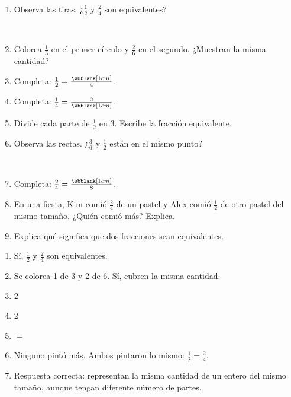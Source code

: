 \begin{wbreview}
\begin{enumerate}
\item Observa las tiras. ¿$\frac{1}{2}$ y $\frac{2}{4}$ son equivalentes? 

\begin{center}
\\[2pt]
\end{center}

\item Colorea $\frac{1}{3}$ en el primer círculo y $\frac{2}{6}$ en el segundo. ¿Muestran la misma cantidad? 

\begin{center}
\hspace{0.8cm}
\end{center}

\item Completa: $\frac{1}{2}=\frac{\wbblank[1cm]}{4}$. 

\item Completa: $\frac{1}{4}=\frac{2}{\wbblank[1cm]}$. 

\item Divide cada parte de $\frac{1}{2}$ en 3. Escribe la fracción equivalente. \wbfracbox {}

\item Observa las rectas. ¿$\frac{3}{6}$ y $\frac{1}{2}$ están en el mismo punto? 

\begin{center}
\\[2pt]
\end{center}

\item Completa: $\frac{2}{4}=\frac{\wbblank[1cm]}{8}$. 

\item En una fiesta, Kim comió $\frac{2}{4}$ de un pastel y Alex comió $\frac{1}{2}$ de otro pastel del mismo tamaño. ¿Quién comió más? Explica. 

\item Explica qué significa que dos fracciones sean equivalentes. 
\end{enumerate}
\end{wbreview}
\begin{enumerate}
\item Sí, $\frac{1}{2}$ y $\frac{2}{4}$ son equivalentes.
\item Se colorea 1 de 3 y 2 de 6. Sí, cubren la misma cantidad.
\item $2$
\item $2$
\item $=$
\item Ninguno pintó más. Ambos pintaron lo mismo: $\frac{1}{2}=\frac{2}{4}$.
\item Respuesta correcta: representan la misma cantidad de un entero del mismo tamaño, aunque tengan diferente número de partes.
\end{enumerate}

